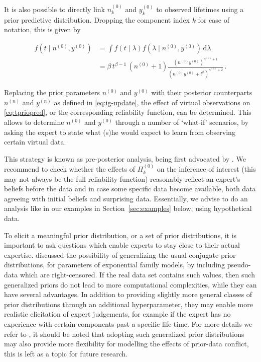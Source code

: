 \documentclass[Journal,SectionNumbers,SingleSpace,InsideFigs]{ascelike}
\newcommand{\dd}{\,\mathrm{d}}
\newcommand{\uz}{^{(0)}} %
\newcommand{\un}{^{(n)}} %
\def\yz{y\uz}
\def\yn{y\un}
\def\ykz{y\uz_k}
\def\nz{n\uz}
\def\nn{n\un}
\def\nkz{n\uz_k}
\def\PkZ{\Pi\uz_k}
\begin{document}
It is also possible to directly link $\nkz$ and $\ykz$
to observed lifetimes using a prior predictive distribution.
Dropping the component index $k$ for ease of notation, this is given by
\begin{linenomath*}
\begin{align}
f(t\mid \nz, \yz)
 &= \int f(t\mid \lambda) f(\lambda\mid\nz,\yz) \dd \lambda \nonumber\\
 &= \beta\, t^{\beta - 1}\, (\nz + 1) \frac{(\nz \yz)^{\nz + 1}}{(\nz \yz + t^\beta)^{\nz + 2}} \,.
\label{eq:tpriopred}
\end{align}
\end{linenomath*}
Replacing the prior parameters $\nz$ and $\yz$
with their posterior counterparts $\nn$ and $\yn$ as defined in \eqref{eq:ig-update},
the effect of virtual observations on \eqref{eq:tpriopred}, or the corresponding reliability function, can be determined.
This allows to determine $\nz$ and $\yz$ through a number of `what-if' scenarios,
by asking the expert to state what (s)he would expect to learn from observing certain virtual data.

This strategy is known as pre-posterior analysis,
being first advocated by .
We recommend to check whether the effects of $\PkZ$ on the inference of interest
(this may not always be the full reliability function)
reasonably reflect an expert's beliefs before the data and in case some specific data become available,
both data agreeing with initial beliefs and surprising data.
Essentially, we advise to do an analysis like in our examples in Section~\ref{sec:examples} below,
using hypothetical data.

To elicit a meaningful prior distribution, or a set of prior distributions,
it is important to ask questions which enable experts to stay close to their actual expertise.
 discussed the possibility of generalizing the usual conjugate prior distributions,
for parameters of exponential family models, by including pseudo-data which are right-censored.
If the real data set contains such values, then such generalized priors do not lead to more computational complexities,
while they can have several advantages.
In addition to providing slightly more general classes of prior distributions through an additional hyperparameter,
they may enable more realistic elicitation of expert judgements,
for example if the expert has no experience with certain components past a specific life time.
For more details we refer to ,
it should be noted that adopting such generalized prior distributions
may also provide more flexibility for modelling the effects of prior-data conflict,
this is left as a topic for future research.
\end{document}
